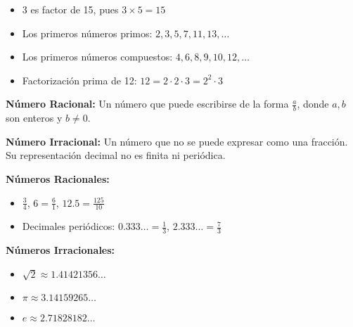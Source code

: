 \begin{example}
\begin{itemize}
    \item 3 es factor de 15, pues $3 \times 5 = 15$
    \item Los primeros números primos: $2, 3, 5, 7, 11, 13, \ldots$
    \item Los primeros números compuestos: $4, 6, 8, 9, 10, 12, \ldots$
    \item Factorización prima de 12: $12 = 2 \cdot 2 \cdot 3 = 2^2 \cdot 3$
\end{itemize}
\end{example}


\begin{definition}
\textbf{Número Racional:} Un número que puede escribirse de la forma $\frac{a}{b}$, donde $a, b$ son enteros y $b \neq 0$.

\textbf{Número Irracional:} Un número que no se puede expresar como una fracción. Su representación decimal no es finita ni periódica.
\end{definition}

\begin{example}
\textbf{Números Racionales:}
\begin{itemize}
    \item $\frac{3}{4}$, $6 = \frac{6}{1}$, $12.5 = \frac{125}{10}$
    \item Decimales periódicos: $0.333\ldots = \frac{1}{3}$, $2.333\ldots = \frac{7}{3}$
\end{itemize}

\textbf{Números Irracionales:}
\begin{itemize}
    \item $\sqrt{2} \approx 1.41421356\ldots$
    \item $\pi \approx 3.14159265\ldots$
    \item $e \approx 2.71828182\ldots$
\end{itemize}
\end{example}